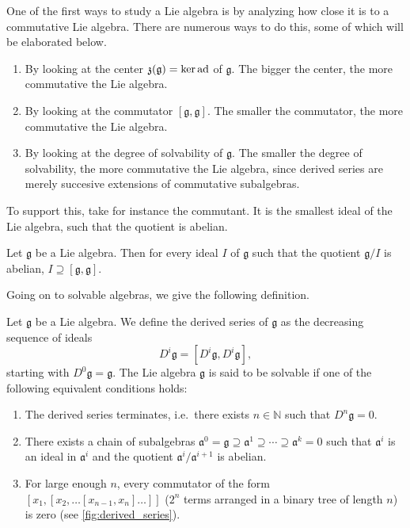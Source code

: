 \documentclass{report}
\begin{document}
One of the first ways to study a Lie algebra is by analyzing how close it is to a commutative Lie algebra.
There are numerous ways to do this, some of which will be elaborated below.
\begin{enumerate}[label = (\roman*)]
    \item By looking at the center $\mathfrak z(\mathfrak g) = \ker \operatorname{ad}$ of $\mathfrak g$. The bigger the center, the more commutative the Lie algebra.
    \item By looking at the commutator $[\mathfrak g, \mathfrak g]$. The smaller the commutator, the more commutative the Lie algebra.
    \item By looking at the degree of solvability of $\mathfrak g$. The smaller the degree of solvability, the more commutative the Lie algebra, since derived series are merely succesive extensions of commutative subalgebras.
\end{enumerate}
To support this, take for instance the commutant.
It is the smallest ideal of the Lie algebra, such that the quotient is abelian.
\begin{lemma}
    Let $\mathfrak g$ be a Lie algebra.
    Then for every ideal $I$ of $\mathfrak g$ such that the quotient $\mathfrak g/I$ is abelian, $I \supseteq [\mathfrak g, \mathfrak g]$.
\end{lemma}
Going on to solvable algebras, we give the following definition.
\begin{definition}
    Let $\mathfrak g$ be a Lie algebra. We define the derived series of $\mathfrak g$ as the decreasing sequence of ideals
    \[
    D^i \mathfrak g = [D^i \mathfrak g, D^i \mathfrak g],
    \]
    starting with $D^0 \mathfrak g = \mathfrak g$.
    The Lie algebra $\mathfrak g$ is said to be solvable if one of the following equivalent conditions holds:
    \begin{enumerate}[label = (\roman*)]
        \item The derived series terminates, i.e.\ there exists $n \in \mathbb N$ such that $D^n \mathfrak g = 0$.
        \item There exists a chain of subalgebras $\mathfrak a^0 = \mathfrak g \supseteq \mathfrak a^1 \supseteq \cdots \supseteq \mathfrak a^k  = 0$ such that $\mathfrak a^i$ is an ideal in $\mathfrak a^i$ and the quotient $\mathfrak a^i/ \mathfrak a^{i+1}$ is abelian.
        \item For large enough $n$, every commutator of the form $[x_1, [x_2, \ldots [x_{n-1}, x_n]\ldots]]$ ($2^n$ terms arranged in a binary tree of length $n$) is zero (see \cref{fig:derived_series}).
    \end{enumerate}
\end{definition}
\end{document}
